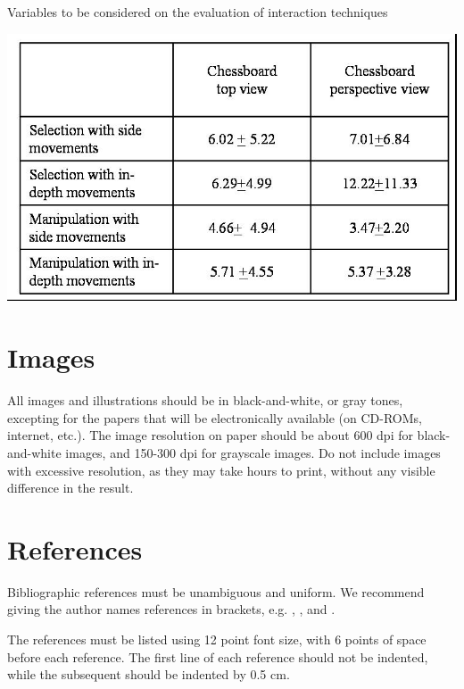 \documentclass[12pt]{article}
\begin{document}
\begin{table}[ht]
\centering
\caption{Variables to be considered on the evaluation of interaction
  techniques}
\label{tab:exTable1}
\includegraphics[width=.7\textwidth]{table.jpg}
\end{table}

\section{Images}

All images and illustrations should be in black-and-white, or gray tones,
excepting for the papers that will be electronically available (on CD-ROMs,
internet, etc.). The image resolution on paper should be about 600 dpi for
black-and-white images, and 150-300 dpi for grayscale images.  Do not include
images with excessive resolution, as they may take hours to print, without any
visible difference in the result. 

\section{References}

Bibliographic references must be unambiguous and uniform.  We recommend giving
the author names references in brackets, e.g. \cite{knuth:84},
\cite{boulic:91}, and \cite{smith:99}.

The references must be listed using 12 point font size, with 6 points of space
before each reference. The first line of each reference should not be
indented, while the subsequent should be indented by 0.5 cm.



\end{document}
